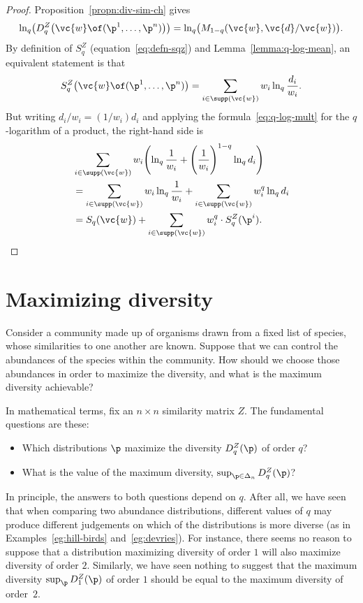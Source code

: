 \begin{proof}
Proposition~\ref{propn:div-sim-ch} gives
\[
\ln_q\bigl( D_q^Z \bigl( \vc{w} \of (\p^1, \ldots, \p^n) \bigr) \bigr)
=
\ln_q \bigl( M_{1 - q} (\vc{w}, \vc{d}/\vc{w}) \bigr).
\]
By definition of $S_q^Z$ (equation~\eqref{eq:defn-sqz}) and
Lemma~\ref{lemma:q-log-mean}, an equivalent statement is that
\[
S_q^Z\bigl( \vc{w} \of (\p^1, \ldots, \p^n) \bigr)
=
\sum_{i \in \supp(\vc{w})} w_i \ln_q \frac{d_i}{w_i}.
\]
But writing $d_i/w_i = (1/w_i)d_i$
and applying the formula~\eqref{eq:q-log-mult} for the $q$-logarithm of a
product, the right-hand side is
% 
\begin{align*}
&
\sum_{i \in \supp(\vc{w})} w_i \Biggl(
\ln_q \frac{1}{w_i} 
+ \Biggl( \frac{1}{w_i} \Biggr)^{1 - q} \ln_q d_i
\Biggr)        \\
&
=
\sum_{i \in \supp(\vc{w})} w_i \ln_q \frac{1}{w_i}
+
\sum_{i \in \supp(\vc{w})} w_i^q \ln_q d_i      \\
&
=
S_q(\vc{w}) + \sum_{i \in \supp(\vc{w})} w_i^q \cdot S_q^Z(\p^i).
\end{align*}
% 
\end{proof}
% 


\section{Maximizing diversity}


Consider a community made up of organisms drawn from a fixed list of
species, whose similarities to one another are known.  Suppose that we can
control the abundances of the species within the community.  How should we
choose those abundances in order to maximize the diversity, and what is the
maximum diversity achievable?

In mathematical terms, fix an $n \times n$ similarity matrix $Z$.
The fundamental questions are these:
% 
\begin{itemize}
\item 
Which distributions $\p$ maximize the diversity $D_q^Z(\p)$
of order $q$?

\item
What is the value of the maximum diversity, $\sup_{\p \in \Delta_n}
D_q^Z(\p)$? 
\end{itemize}
% 
In principle, the answers to both questions depend on $q$.  After all, we
have seen that when comparing two abundance distributions, different values
of $q$ may produce different judgements on which of the distributions is
more diverse (as in Examples~\ref{eg:hill-birds} and~\ref{eg:devries}).
For instance, there seems no reason to suppose that a distribution
maximizing diversity of order $1$ will also maximize diversity of order $2$.
Similarly, we have seen nothing to suggest that the maximum diversity
$\sup_\p D_1^Z(\p)$ of order $1$ should be equal to the maximum diversity
of order~$2$.

